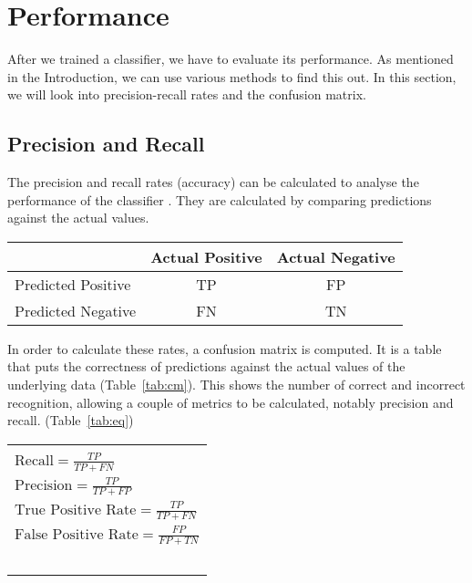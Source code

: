 \newpage
\section{Performance}
After we trained a classifier, we have to evaluate its performance. As mentioned in the Introduction, we can use various methods to find this out. In this section, we will look into precision-recall rates and the confusion matrix. 

\subsection{Precision and Recall}
The precision and recall rates (accuracy) can be calculated to analyse the performance of the classifier \cite{precision-recall}. They are calculated by comparing predictions against the actual values.

\parbox{\linewidth} {
  \centering
  \begin{tabular}{|l|c|c|}
    \hline
                        & Actual Positive & Actual Negative
    \\ \hline
    Predicted Positive  & TP              & FP
    \\ \hline
    Predicted Negative  & FN              & TN
    \\ \hline
  \end{tabular}

  \label{tab:cm}
}

In order to calculate these rates, a confusion matrix is computed. It is a table that puts the correctness of predictions against the actual values of the underlying data (Table~\ref{tab:cm}). This shows the number of correct and incorrect recognition, allowing a couple of metrics to be calculated, notably precision and recall. (Table~\ref{tab:eq}) 

\parbox{\linewidth} {
  \centering
  \begin{tabular}{|l|}
    \hline \\
    \( \text{Recall}              = \frac{TP}{TP + FN} \) \\[10pt]
    \( \text{Precision}           = \frac{TP}{TP + FP} \) \\[10pt]
    \( \text{True Positive Rate}  = \frac{TP}{TP + FN} \) \\[10pt]
    \( \text{False Positive Rate} = \frac{FP}{FP + TN} \) \\~\\
    \hline
  \end{tabular}
  
  \label{tab:eq}
}

